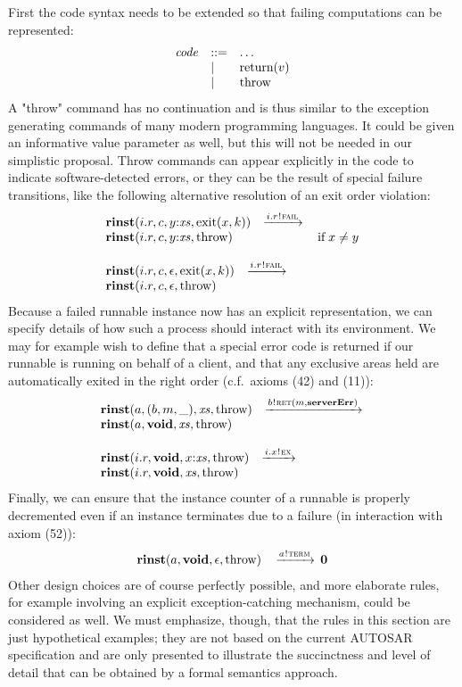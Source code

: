 \documentclass[10pt,conference]{IEEEtran}
\begin{document}
First the code syntax needs to be extended so that failing computations can be represented:
$$
\begin{array}{lll}
  \Code & ::= & \ldots               \\
        & |   & \Return v            \\
        & |   & \Throw
\end{array}
$$
A "throw" command has no continuation and is thus similar to the exception generating commands of many modern programming languages. It could be given an informative value parameter as well, but this will not be needed in our simplistic proposal. Throw commands can appear explicitly in the code to indicate software-detected errors, or they can be the result of special failure transitions, like the following alternative resolution of an exit order violation:
$$
\begin{array}{lcll}
		{\Trinst {i.r} c {\Tcons y \Xs} {\TrteExit x k}}
		\;\; \red {\Tsay {i.r} \Tfail} \\
		{\Trinst {i.r} c {\Tcons y \Xs} \Throw}
		& \Pif\;x \neq y
\\ \\
		{\Trinst {i.r} c \Teps {\TrteExit x k}}
		\;\; \red {\Tsay {i.r} \Tfail}  \\
		{\Trinst {i.r} c \Teps \Throw}
\end{array}
$$
Because a failed runnable instance now has an explicit representation, we can specify details of how such a process should interact with its environment. We may for example wish to define that a special error code is returned if our runnable is running on behalf of a client, and that any exclusive areas held are automatically exited in the right order (c.f.~axioms (42) and (11)):
$$
\begin{array}{lcll}
		{\Trinst a {\Tclient b m \_} \Xs \Throw}
		\;\; \red{\Tsay b {\Tret m {\kw{serverErr}}}} \\
		{\Trinst a \Tvoid \Xs \Throw}
\\ \\
		{\Trinst {i.r} \Tvoid {\Tcons x \Xs} \Throw}
		\;\; \red{\Tsay {i.x} \Tex} \\
		{\Trinst {i.r} \Tvoid \Xs \Throw}
\end{array}
$$
Finally, we can ensure that the instance counter of a runnable is properly decremented even if an instance terminates due to a failure (in interaction with axiom (52)):
$$
\begin{array}{rcll}
		{\textbf{rinst}(a,\textbf{void},\epsilon,\text{throw})}
		& \,\xrightarrow{a \mspace{1mu}!\mspace{1mu} \textsc{term}}\,
		\textbf{0}
\end{array}
$$
Other design choices are of course perfectly possible, and more elaborate rules, for example involving an explicit exception-catching mechanism, could be considered as well. We must emphasize, though, that the rules in this section are just hypothetical examples; they are not based on the current AUTOSAR specification and are only presented to illustrate the succinctness and level of detail that can be obtained by a formal semantics approach.
\end{document}
